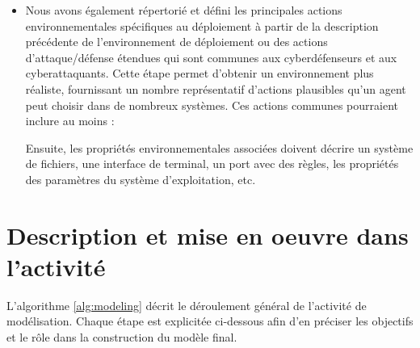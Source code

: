 \begin{itemize}
    \item Nous avons également répertorié et défini les principales actions environnementales spécifiques au déploiement à partir de la description précédente de l'environnement de déploiement ou des actions d'attaque/défense étendues qui sont communes aux cyberdéfenseurs et aux cyberattaquants. Cette étape permet d'obtenir un environnement plus réaliste, fournissant un nombre représentatif d'actions plausibles qu'un agent peut choisir dans de nombreux systèmes.
          Ces actions communes pourraient inclure au moins :
          Ensuite, les propriétés environnementales associées doivent décrire un système de fichiers, une interface de terminal, un port avec des règles, les propriétés des paramètres du système d'exploitation, etc.
\end{itemize}

\section{Description et mise en oeuvre dans l'activité}

L’algorithme \ref{alg:modeling} décrit le déroulement général de l’activité de modélisation.
Chaque étape est explicitée ci-dessous afin d’en préciser les objectifs et le rôle dans la construction du modèle final.

